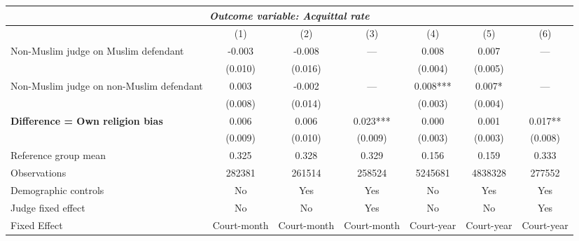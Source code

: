 {
\def\sym#1{\ifmmode^{#1}\else\(^{#1}\)\fi}
\begin{tabular}{l*{6}{c}}
  \hline\hline
\multicolumn{7}{c}{\textit{Outcome variable: Acquittal rate}}\\
\hline
&\multicolumn{1}{c}{(1)}&\multicolumn{1}{c}{(2)}&\multicolumn{1}{c}{(3)}&\multicolumn{1}{c}{(4)}&\multicolumn{1}{c}{(5)}&\multicolumn{1}{c}{(6)}\\
\hline
Non-Muslim judge on Muslim defendant \hspace{15mm}& -0.003 & -0.008 & --- & 0.008 & 0.007 & --- \\
& (0.010) & (0.016) &  & (0.004) &(0.005) &  \\
Non-Muslim judge on non-Muslim defendant \hspace{15mm}& 0.003 & -0.002 & ---& 0.008*** & 0.007* & --- \\
& (0.008) & (0.014) &  & (0.003) & (0.004) &  \\
\textbf{Difference = Own religion bias} & 0.006 & 0.006 & 0.023*** & 0.000 & 0.001 & 0.017** \\
& (0.009) & (0.010) & (0.009) & (0.003) & (0.003) & (0.008) \\
\hline
Reference group mean & 0.325 & 0.328 & 0.329 & 0.156 & 0.159 & 0.333 \\
Observations & 282381 & 261514 & 258524 & 5245681 & 4838328 & 277552 \\
Demographic controls & No & Yes & Yes & No & Yes & Yes \\
Judge fixed effect & No & No & Yes & No & No & Yes \\
Fixed Effect & Court-month & Court-month & Court-month & Court-year & Court-year & Court-year \\
\hline\hline
\end{tabular}
}
 
